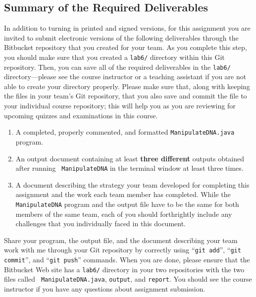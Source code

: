 \vspace{-0.25in}
\subsection*{Summary of the Required Deliverables}
\vspace{-0.05in}

In addition to turning in printed and signed versions, for this assignment you are invited to submit electronic versions
of the following deliverables through the Bitbucket repository that you created for your team. As you complete this
step, you should make sure that you created a {\tt lab6/} directory within this Git repository.  Then, you can save all
of the required deliverables in the {\tt lab6/} directory---please see the course instructor or a teaching assistant if
you are not able to create your directory properly. Please make sure that, along with keeping the files in your team's
Git repository, that you also save and commit the file to your individual course repository; this will help you as you
are reviewing for upcoming quizzes and examinations in this course.

\vspace*{-.1in}
\begin{enumerate}

  \itemsep0in

  \item A completed, properly commented, and formatted {\tt ManipulateDNA.java} program.

  \item An output document containing at least \textbf{three different} outputs obtained after running {\tt
    ManipulateDNA} in the terminal window at least three times.

  \item A document describing the strategy your team developed for completing this assignment and the work each team
    member has completed. While the {\tt ManipulateDNA} program and the output file have to be the same for both members
    of the same team, each of you should forthrightly include any challenges that you individually faced in this document.

\end{enumerate}
\vspace{-0.1in}

Share your program, the output file, and the document describing your team work with me through your Git repository by
correctly using ``{\tt git add}'', ``{\tt git commit}'', and ``{\tt git push}'' commands. When you are done, please
ensure that the Bitbucket Web site has a {\tt lab6/} directory in your two repositories with the two files called {\tt
ManipulateDNA.java}, {\tt output}, and {\tt report}. You should see the course instructor if you have any questions
about assignment submission.


